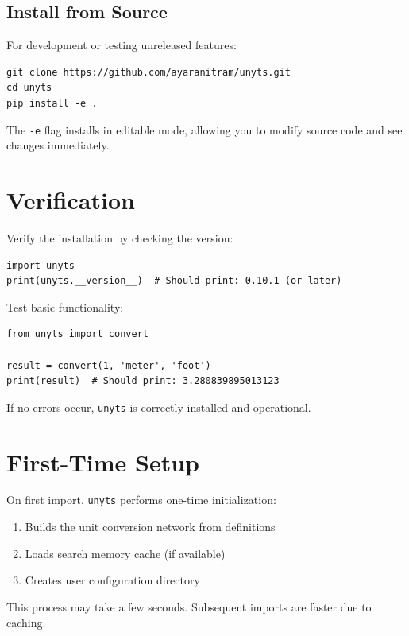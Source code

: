 \documentclass[11pt,a4paper]{report}
\begin{document}
\subsection{Install from Source}

For development or testing unreleased features:
\begin{lstlisting}[style=bashstyle]
git clone https://github.com/ayaranitram/unyts.git
cd unyts
pip install -e .
\end{lstlisting}

The \texttt{-e} flag installs in editable mode, allowing you to modify source code and see changes immediately.

\section{Verification}

Verify the installation by checking the version:

\begin{lstlisting}[style=pythonstyle]
import unyts
print(unyts.__version__)  # Should print: 0.10.1 (or later)
\end{lstlisting}

Test basic functionality:

\begin{lstlisting}[style=pythonstyle]
from unyts import convert

result = convert(1, 'meter', 'foot')
print(result)  # Should print: 3.280839895013123
\end{lstlisting}

If no errors occur, \texttt{unyts} is correctly installed and operational.

\section{First-Time Setup}

On first import, \texttt{unyts} performs one-time initialization:
\begin{enumerate}[leftmargin=*]
  \item Builds the unit conversion network from definitions
  \item Loads search memory cache (if available)
  \item Creates user configuration directory
\end{enumerate}

This process may take a few seconds. Subsequent imports are faster due to caching.
\end{document}
